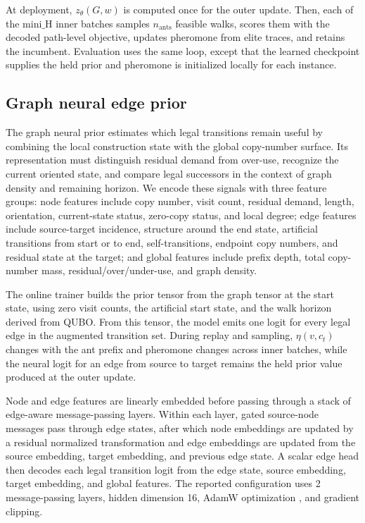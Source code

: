 \documentclass[11pt]{article}
\begin{document}
At deployment, $z_\theta(G,w)$ is computed once for the outer update. Then, each of the $\mathrm{mini\_H}$ inner batches samples $n_{\mathrm{ants}}$ feasible walks, scores them with the decoded path-level objective, updates pheromone from elite traces, and retains the incumbent. Evaluation uses the same loop, except that the learned checkpoint supplies the held prior and pheromone is initialized locally for each instance.

\subsection{Graph neural edge prior}

The graph neural prior estimates which legal transitions remain useful by combining the local construction state with the global copy-number surface. Its representation must distinguish residual demand from over-use, recognize the current oriented state, and compare legal successors in the context of graph density and remaining horizon. We encode these signals with three feature groups: node features include copy number, visit count, residual demand, length, orientation, current-state status, zero-copy status, and local degree; edge features include source-target incidence, structure around the end state, artificial transitions from start or to end, self-transitions, endpoint copy numbers, and residual state at the target; and global features include prefix depth, total copy-number mass, residual/over/under-use, and graph density.

The online trainer builds the prior tensor from the graph tensor at the start state, using zero visit counts, the artificial start state, and the walk horizon derived from QUBO. From this tensor, the model emits one logit for every legal edge in the augmented transition set. During replay and sampling, $\eta(v,c_t)$ changes with the ant prefix and pheromone changes across inner batches, while the neural logit for an edge from source to target remains the held prior value produced at the outer update.

Node and edge features are linearly embedded before passing through a stack of edge-aware message-passing layers. Within each layer, gated source-node messages pass through edge states, after which node embeddings are updated by a residual normalized transformation and edge embeddings are updated from the source embedding, target embedding, and previous edge state. A scalar edge head then decodes each legal transition logit from the edge state, source embedding, target embedding, and global features. The reported configuration uses 2 message-passing layers, hidden dimension 16, AdamW optimization \citep{loshchilov2019adamw}, and gradient clipping.
\end{document}

